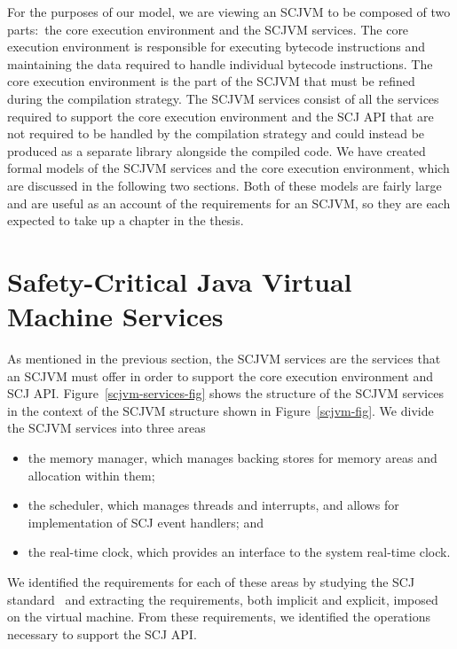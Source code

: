 \documentclass[a4paper,10pt]{report}
\begin{document}
For the purposes of our model, we are viewing an SCJVM to be composed
of two parts:~the core execution environment and the SCJVM services.
The core execution environment is responsible for executing bytecode
instructions and maintaining the data required to handle individual
bytecode instructions.
The core execution environment is the part of the SCJVM that must be
refined during the compilation strategy.
The SCJVM services consist of all the services required to support the
core execution environment and the SCJ API that are not required to be
handled by the compilation strategy and could instead be produced as a
separate library alongside the compiled code.
We have created formal models of the SCJVM services and the core
execution environment, which are discussed in the following two
sections.
Both of these models are fairly large and are useful as an account of
the requirements for an SCJVM, so they are each expected to take up a
chapter in the thesis.

\section{Safety-Critical Java Virtual Machine Services}


As mentioned in the previous section, the SCJVM services are the
services that an SCJVM must offer in order to support the core
execution environment and SCJ API.
Figure~\ref{scjvm-services-fig} shows the structure of the SCJVM
services in the context of the SCJVM structure shown in
Figure~\ref{scjvm-fig}.
We divide the SCJVM services into three areas
\begin{itemize}
\item the memory manager, which manages backing stores for memory
  areas and allocation within them;
\item the scheduler, which manages threads and interrupts, and allows
  for implementation of SCJ event handlers; and
\item the real-time clock, which provides an interface to the system
  real-time clock.
\end{itemize}
We identified the requirements for each of these areas by studying the
SCJ standard~\cite{locke2013} and extracting the requirements, both
implicit and explicit, imposed on the virtual machine.
From these requirements, we identified the operations necessary to
support the SCJ API.
\end{document}

